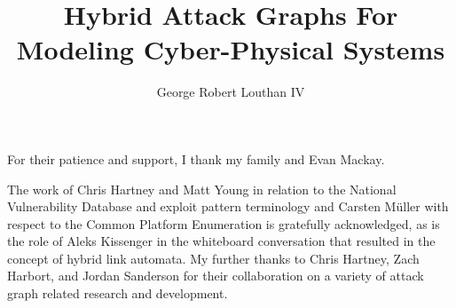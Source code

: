 \documentclass[12pt,letterpaper]{report}
\newif\iftestbox
\begin{document}
\iftestbox \testboxex \fi

%
%
\title{Hybrid Attack Graphs For Modeling Cyber-Physical Systems}
\author{George Robert Louthan IV}

%
%
\coadvisorfalse  %

%
%


\numofpages{\pageref{LastPage}}                    %

%
%
\thesistrue  %

%
%

\copyrightfalse
\figurespagetrue   %
\tablespagetrue    %


\beforeabstract    %
\abstractp         %


%
%



\acknowledgementsp
For their patience and support, I thank my family and Evan Mackay.

The work of Chris Hartney and Matt Young in relation to the National Vulnerability
Database and exploit pattern terminology and Carsten M\"{u}ller with respect to
the Common Platform Enumeration is gratefully acknowledged, as is the
role of Aleks Kissenger in the whiteboard conversation that resulted in the 
concept of hybrid link automata. My further thanks to Chris Hartney, Zach 
Harbort, and Jordan Sanderson for their collaboration on a variety of attack 
graph related research and development.
\end{document}
